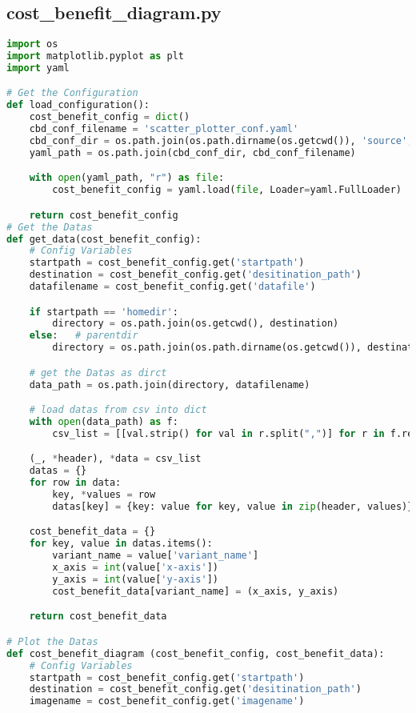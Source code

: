 \subsection{cost\_benefit\_diagram.py}
\lstset{style=gra_codestyle}
\begin{lstlisting}[language=python, caption=Python LaTex - cost\_benefit\_diagram.py - Kosten-Nutzen-Diagramm,captionpos=b,label={lst:cost_benefit_diagram},breaklines=true]
import os
import matplotlib.pyplot as plt
import yaml

# Get the Configuration
def load_configuration():
    cost_benefit_config = dict()
    cbd_conf_filename = 'scatter_plotter_conf.yaml'
    cbd_conf_dir = os.path.join(os.path.dirname(os.getcwd()), 'source', 'configuration')
    yaml_path = os.path.join(cbd_conf_dir, cbd_conf_filename)

    with open(yaml_path, "r") as file:
        cost_benefit_config = yaml.load(file, Loader=yaml.FullLoader)

    return cost_benefit_config
# Get the Datas
def get_data(cost_benefit_config):
    # Config Variables
    startpath = cost_benefit_config.get('startpath')
    destination = cost_benefit_config.get('desitination_path')
    datafilename = cost_benefit_config.get('datafile')

    if startpath == 'homedir':
        directory = os.path.join(os.getcwd(), destination)
    else:   # parentdir
        directory = os.path.join(os.path.dirname(os.getcwd()), destination)

    # get the Datas as dirct
    data_path = os.path.join(directory, datafilename)

    # load datas from csv into dict
    with open(data_path) as f:
        csv_list = [[val.strip() for val in r.split(",")] for r in f.readlines()]

    (_, *header), *data = csv_list
    datas = {}
    for row in data:
        key, *values = row
        datas[key] = {key: value for key, value in zip(header, values)}

    cost_benefit_data = {}
    for key, value in datas.items():
        variant_name = value['variant_name']
        x_axis = int(value['x-axis'])
        y_axis = int(value['y-axis'])
        cost_benefit_data[variant_name] = (x_axis, y_axis)

    return cost_benefit_data

# Plot the Datas
def cost_benefit_diagram (cost_benefit_config, cost_benefit_data):
    # Config Variables
    startpath = cost_benefit_config.get('startpath')
    destination = cost_benefit_config.get('desitination_path')
    imagename = cost_benefit_config.get('imagename')


\end{lstlisting}
